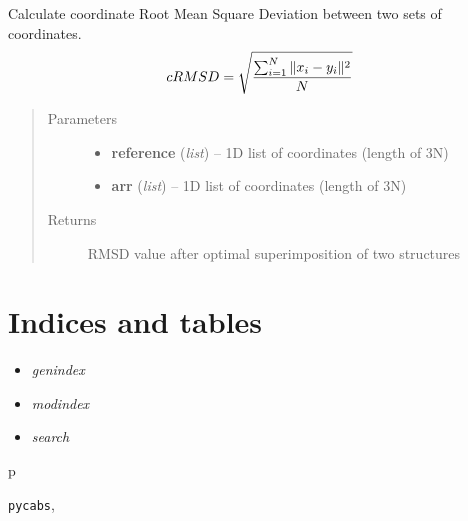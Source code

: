 \documentclass[letterpaper,10pt,english]{sphinxmanual}
\begin{document}

\begin{fulllineitems}
\label{api:pycabs.rmsd}
Calculate coordinate Root Mean Square Deviation between two sets of coordinates.
\begin{gather}
\begin{split}cRMSD = \sqrt{ \sum_{i=1}^N \|x_{i} - y_{i}\|^2 \over N}\end{split}\notag
\end{gather}\begin{quote}\begin{description}
\item[{Parameters}] \leavevmode\begin{itemize}
\item {} 
\textbf{reference} (\emph{list}) -- 1D list of coordinates (length of 3N)

\item {} 
\textbf{arr} (\emph{list}) -- 1D list of coordinates (length of 3N)

\end{itemize}

\item[{Returns}] \leavevmode
RMSD value after optimal superimposition of two structures

\end{description}\end{quote}

\end{fulllineitems}



\chapter{Indices and tables}
\label{index:indices-and-tables}\begin{itemize}
\item {} 
\emph{genindex}

\item {} 
\emph{modindex}

\item {} 
\emph{search}

\end{itemize}


\renewcommand{\indexname}{Python Module Index}
\begin{theindex}
\def\bigletter#1{{\Large\sffamily#1}\nopagebreak\vspace{1mm}}
\bigletter{p}
\item {\texttt{pycabs}}, \pageref{api:module-pycabs}
\end{theindex}

\renewcommand{\indexname}{Index}
\printindex
\end{document}
